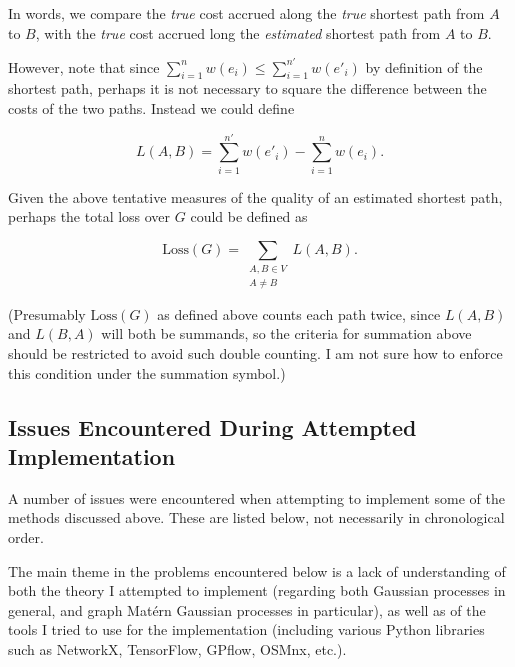 In words, we compare the \textit{true} cost accrued along the \textit{true} shortest path from $A$ to $B$, with the \textit{true} cost accrued long the \textit{estimated} shortest path from $A$ to $B$.

However, note that since $\sum_{i = 1}^n w(e_i) \leq \sum_{i = 1}^{n'} w(e'_i)$ by definition of the shortest path, perhaps it is not necessary to square the difference between the costs of the two paths. Instead we could define

\[
    L(A, B) = \sum_{i = 1}^{n'} w(e'_i) - \sum_{i = 1}^n w(e_i).
\]

Given the above tentative measures of the quality of an estimated shortest path, perhaps the total loss over $G$ could be defined as

\[
    \text{Loss}(G) = \sum_{\substack{A, B \in V \\ A \neq B}} L(A, B).
\]

(Presumably $\text{Loss}(G)$ as defined above counts each path twice, since $L(A, B)$ and $L(B, A)$ will both be summands, so the criteria for summation above should be restricted to avoid such double counting. I am not sure how to enforce this condition under the summation symbol.)


\subsection{Issues Encountered During Attempted Implementation}

A number of issues were encountered when attempting to implement some of the methods discussed above. These are listed below, not necessarily in chronological order.

The main theme in the problems encountered below is a lack of understanding of both the theory I attempted to implement (regarding both Gaussian processes in general, and graph Mat\'{e}rn Gaussian processes in particular), as well as of the tools I tried to use for the implementation (including various Python libraries such as NetworkX, TensorFlow, GPflow, OSMnx, etc.).

